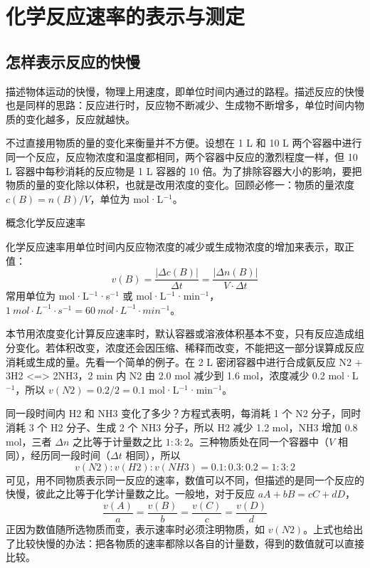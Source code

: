 \documentclass[UTF8,a4paper,zihao=5,oneside,openany,fontset=none]{ctexbook}
\def\heiti{\CJKfamily{zhhei}}
\def\mathrm#1{#1}\def\text#1{#1}\def\ensuremath#1{#1}\def\ce#1{#1}%
\newcommand{\textheading}[2]{\par\addvspace{.6em}\Needspace{4\baselineskip}\noindent
 {\heiti\if\relax\detokenize{#2}\relax #1\else #2\fi}\par\nobreak\smallskip\nobreak\color{black}\ignorespaces}
\newenvironment{gainian}[1][]{\textheading{概念}{#1}}{\par\smallskip}
\begin{document}
\section{化学反应速率的表示与测定}

\subsection{怎样表示反应的快慢}

描述物体运动的快慢，物理上用速度，即单位时间内通过的路程。描述反应的快慢也是同样的思路：反应进行时，反应物不断减少、生成物不断增多，单位时间内物质的变化越多，反应就越快。

不过直接用物质的量的变化来衡量并不方便。设想在 1 L 和 10 L 两个容器中进行同一个反应，反应物浓度和温度都相同，两个容器中反应的激烈程度一样，但 10 L 容器中每秒消耗的反应物是 1 L 容器的 10 倍。为了排除容器大小的影响，要把物质的量的变化除以体积，也就是改用浓度的变化。回顾必修一：物质的量浓度 $c(\mathrm{B})=n(\mathrm{B})/V$，单位为 mol·L$^{-1}$。

\begin{gainian}[化学反应速率]
化学反应速率用单位时间内反应物浓度的减少或生成物浓度的增加来表示，取正值：
\[v(\mathrm{B})=\frac{|\Delta c(\mathrm{B})|}{\Delta t}=\frac{|\Delta n(\mathrm{B})|}{V\cdot\Delta t}\]
常用单位为 mol·L$^{-1}$·s$^{-1}$ 或 mol·L$^{-1}$·min$^{-1}$，$1\ \mathrm{mol\cdot L^{-1}\cdot s^{-1}}=60\ \mathrm{mol\cdot L^{-1}\cdot min^{-1}}$。
\end{gainian}

本节用浓度变化计算反应速率时，默认容器或溶液体积基本不变，只有反应造成组分变化。若体积改变，浓度还会因压缩、稀释而改变，不能把这一部分误算成反应消耗或生成的量。先看一个简单的例子。在 2 L 密闭容器中进行合成氨反应 \ce{N2 + 3H2 <=> 2NH3}，2 min 内 \ce{N2} 由 2.0 mol 减少到 1.6 mol，浓度减少 0.2 mol·L$^{-1}$，所以 $v(\ce{N2})=0.2/2=0.1$ mol·L$^{-1}$·min$^{-1}$。

同一段时间内 \ce{H2} 和 \ce{NH3} 变化了多少？方程式表明，每消耗 1 个 \ce{N2} 分子，同时消耗 3 个 \ce{H2} 分子、生成 2 个 \ce{NH3} 分子，所以 \ce{H2} 减少 1.2 mol，\ce{NH3} 增加 0.8 mol，三者 $\Delta n$ 之比等于计量数之比 $1:3:2$。三种物质处在同一个容器中（$V$ 相同），经历同一段时间（$\Delta t$ 相同），所以
\[v(\ce{N2}):v(\ce{H2}):v(\ce{NH3})=0.1:0.3:0.2=1:3:2\]
可见，用不同物质表示同一反应的速率，数值可以不同，但描述的是同一个反应的快慢，彼此之比等于化学计量数之比。一般地，对于反应 $a\mathrm{A}+b\mathrm{B}=c\mathrm{C}+d\mathrm{D}$，
\[\frac{v(\mathrm{A})}{a}=\frac{v(\mathrm{B})}{b}=\frac{v(\mathrm{C})}{c}=\frac{v(\mathrm{D})}{d}\]
正因为数值随所选物质而变，表示速率时必须注明物质，如 $v(\ce{N2})$。上式也给出了比较快慢的办法：把各物质的速率都除以各自的计量数，得到的数值就可以直接比较。
\end{document}
